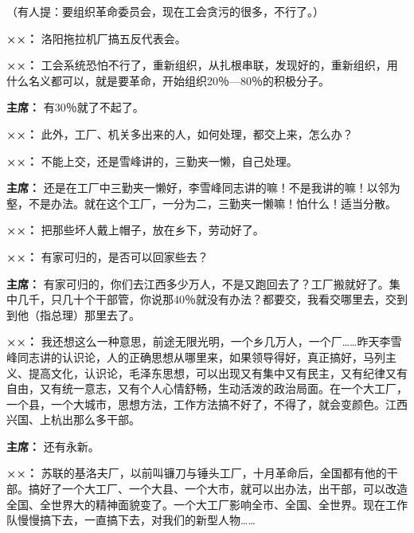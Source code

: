 \begin{duihua}
（有人提：要组织革命委员会，现在工会贪污的很多，不行了。）

\item[\textbf{××：}] 洛阳拖拉机厂搞五反代表会。

\item[\textbf{××：}] 工会系统恐怕不行了，重新组织，从扎根串联，发现好的，重新组织，用什么名义都可以，就是要革命，开始组织20％—80％的积极分子。

\item[\textbf{主席：}] 有30％就了不起了。

\item[\textbf{××：}] 此外，工厂、机关多出来的人，如何处理，都交上来，怎么办？

\item[\textbf{××：}] 不能上交，还是雪峰讲的，三勤夹一懒，自己处理。

\item[\textbf{主席：}] 还是在工厂中三勤夹一懒好，李雪峰同志讲的嘛！不是我讲的嘛！以邻为壑，不是办法。就在这个工厂，一分为二，三勤夹一懒嘛！怕什么！适当分散。

\item[\textbf{××：}] 把那些坏人戴上帽子，放在乡下，劳动好了。

\item[\textbf{××：}] 有家可归的，是否可以回家些去？

\item[\textbf{主席：}] 有家可归的，你们去江西多少万人，不是又跑回去了？工厂搬就好了。集中几千，只几十个干部管，你说那40％就没有办法？都要交，我看交哪里去，交到到他（指总理）那里去了。

\item[\textbf{××：}] 我还想这么一种意思，前途无限光明，一个乡几万人，一个厂……昨天李雪峰同志讲的认识论，人的正确思想从哪里来，如果领导得好，真正搞好，马列主义、提高文化，认识论，毛泽东思想，可以出现又有集中又有民主，又有纪律又有自由，又有统一意志，又有个人心情舒畅，生动活泼的政治局面。在一个大工厂，一个县，一个大城市，思想方法，工作方法搞不好了，不得了，就会变颜色。江西兴国、上杭出那么多干部。

\item[\textbf{主席：}] 还有永新。

\item[\textbf{××：}] 苏联的基洛夫厂，以前叫镰刀与锤头工厂，十月革命后，全国都有他的干部。搞好了一个大工厂、一个大县、一个大市，就可以出办法，出干部，可以改造全国、全世界大的精神面貌变了。一个大工厂影响全市、全国、全世界。现在工作队慢慢搞下去，一直搞下去，对我们的新型人物……


\end{duihua}
